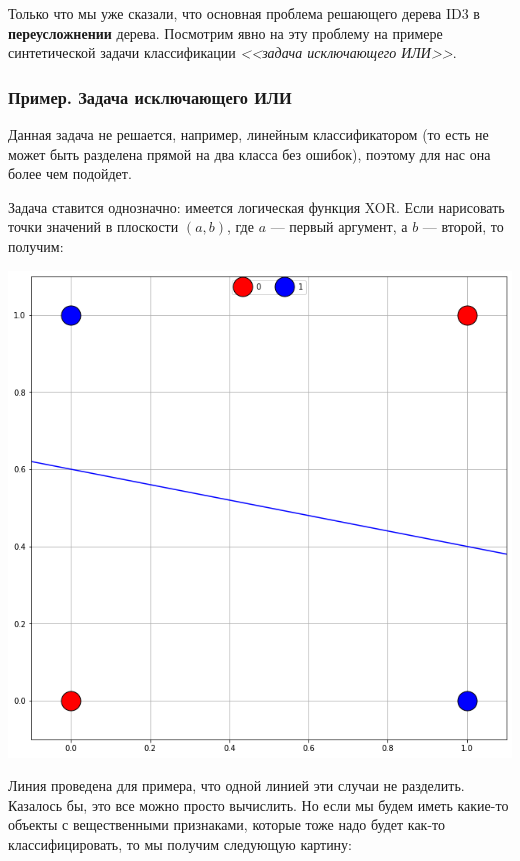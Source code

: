 \documentclass{article}
\begin{document}
Только что мы уже сказали, что основная проблема решающего дерева ID3 в \textbf{переусложнении} дерева. Посмотрим явно на эту проблему на примере синтетической задачи классификации \textit{<<задача исключающего ИЛИ>>}.

\subsubsection{Пример. Задача исключающего ИЛИ}

Данная задача не решается, например, линейным классификатором (то есть не может быть разделена прямой на два класса без ошибок), поэтому для нас она более чем подойдет.

Задача ставится однозначно: имеется логическая функция XOR. Если нарисовать точки значений в плоскости $(a, b)$, где $a$ --- первый аргумент, а $b$ --- второй, то получим:

\begin{center}
    \includegraphics[scale=0.3]{images/3_4.png}
\end{center}

Линия проведена для примера, что одной линией эти случаи не разделить. Казалось бы, это все можно просто вычислить. Но если мы будем иметь какие-то объекты с вещественными признаками, которые тоже надо будет как-то классифицировать, то мы получим следующую картину:
\end{document}
